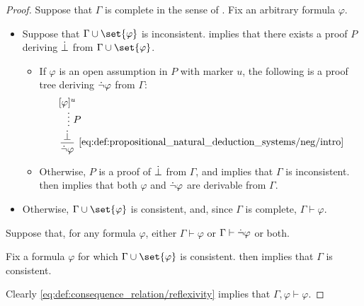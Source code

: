 \begin{proof}
  \SufficiencySubProof Suppose that \( \Gamma \) is complete in the sense of . Fix an arbitrary formula \( \varphi \).

  \begin{itemize}
    \item Suppose that \( \Gamma \cup \set{ \varphi } \) is inconsistent.  implies that there exists a proof \( P \) deriving \( \dot\bot \) from \( \Gamma \cup \set{ \varphi } \).

    \begin{itemize}
      \item If \( \varphi \) is an open assumption in \( P \) with marker \( u \), the following is a proof tree deriving \( \dot\neg \varphi \) from \( \Gamma \):
      \begin{equation*}
        \begin{prooftree}
          \hypo{ [\varphi]^u }
          \ellipsis { \( P \) } { \synbot }
          \infer1[\ref{eq:def:propositional_natural_deduction_systems/neg/intro}]{ \synneg \varphi }.
        \end{prooftree}
      \end{equation*}

      \item Otherwise, \( P \) is a proof of \( \dot\bot \) from \( \Gamma \), and  implies that \( \Gamma \) is inconsistent.  then implies that both \( \varphi \) and \( \dot\neg \varphi \) are derivable from \( \Gamma \).
    \end{itemize}

    \item Otherwise, \( \Gamma \cup \set{ \varphi } \) is consistent, and, since \( \Gamma \) is complete, \( \Gamma \vdash \varphi \).
  \end{itemize}

  \NecessitySubProof Suppose that, for any formula \( \varphi \), either \( \Gamma \vdash \varphi \) or \( \Gamma \vdash \dot\neg \varphi \) or both.

  Fix a formula \( \varphi \) for which \( \Gamma \cup \set{ \varphi } \) is consistent.  then implies that \( \Gamma \) is consistent.

  Clearly \eqref{eq:def:consequence_relation/reflexivity} implies that \( \Gamma, \varphi \vdash \varphi \).


\end{proof}
